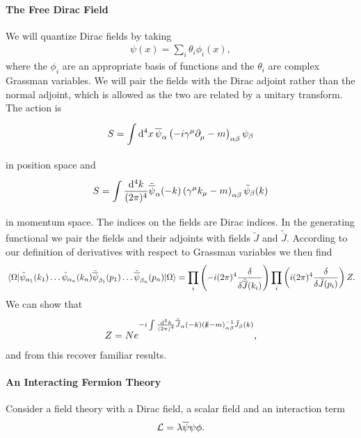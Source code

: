 \paragraph{The Free Dirac Field}
We will quantize Dirac fields by taking
\begin{align*}
	\psi(x) = \sum\limits_{i}\theta_{i}\phi_{i}(x),
\end{align*}
where the $\phi_{i}$ are an appropriate basis of functions and the $\theta_{i}$ are complex Grassman variables. We will pair the fields with the Dirac adjoint rather than the normal adjoint, which is allowed as the two are related by a unitary transform. The action is
\begin{align*}
	S = \int\limits_{}^{}\dd[4]{x}\overline{\psi}_{\alpha}\left(-i\gamma^{\mu}\partial^{}_{\mu} - m\right)_{\alpha\beta}\psi_{\beta}
\end{align*}
in position space and
\begin{align*}
	S = \int\limits_{}^{}\frac{\dd[4]{k}}{(2\pi)^{4}}\tilde{\overline{\psi}}_{\alpha}(-k)\left(\gamma^{\mu}k_{\mu} - m\right)_{\alpha\beta}\tilde{\psi}_{\beta}(k)
\end{align*}
in momentum space. The indices on the fields are Dirac indices. In the generating functional we pair the fields and their adjoints with fields $\tilde{J}$ and $\tilde{\overline{J}}$. According to our definition of derivatives with respect to Grassman variables we then find
\begin{align*}
	\expval{\tilde{\psi}_{\alpha_{1}}(k_{1})\dots\tilde{\psi}_{\alpha_{n}}(k_{n})\tilde{\overline{\psi}}_{\beta_{1}}(p_{1})\dots\tilde{\overline{\psi}}_{\beta_{n}}(p_{n})}{\Omega} = \prod\limits_{i}\left(-i(2\pi)^{4}\fdv{\tilde{\overline{J}}(k_{i})}\right)\prod\limits_{i}\left(i(2\pi)^{4}\fdv{\tilde{J}(p_{i})}\right)Z.
\end{align*}
We can show that
\begin{align*}
	Z = Ne^{-i\int\limits_{}^{}\frac{\dd[4]{k}}{(2\pi)^{4}}\tilde{\overline{J}}_{\alpha}(-k)(\slashed{k} - m)_{\alpha\beta}^{-1}\tilde{J}_{\beta}(k)},
\end{align*}
and from this recover familiar results.

\paragraph{An Interacting Fermion Theory}
Consider a field theory with a Dirac field, a scalar field and an interaction term
\begin{align*}
	\mathcal{L} = \lambda\overline{\psi}\psi\phi.
\end{align*}
